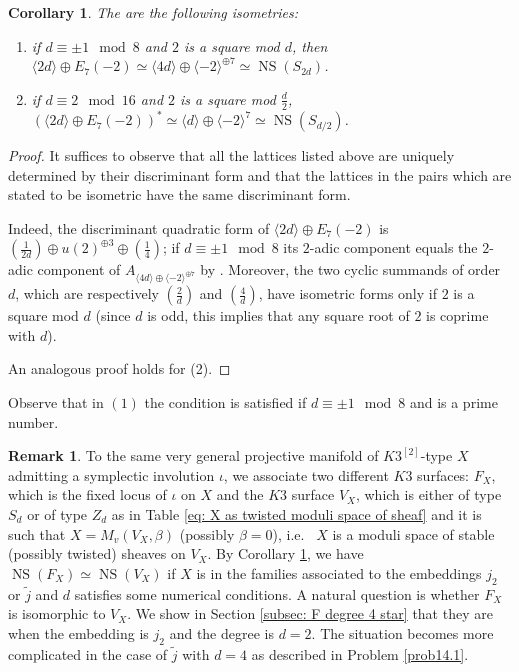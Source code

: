 \documentclass{amsart}
\newtheorem{cor}[thm]{Corollary}
\theoremstyle{definition}
\newtheorem{remark}[thm]{Remark}
\numberwithin{equation}{section}
\numberwithin{equation}{section} \theoremstyle{definition}
\DeclareMathOperator{\NS}{NS}
\begin{document}
\begin{cor}\label{cor: isom between NS(F) and NS(S),NS(Z)}  
The are the following isometries:
\begin{enumerate}
\item if $d\equiv \pm 1\mod 8$ and $2$ is a square mod $d$, then $\langle 2d\rangle\oplus E_7(-2)\simeq \langle 4d\rangle \oplus \langle -2\rangle^{\oplus 7}\simeq \NS(S_{2d})$.
\item if $d\equiv 2\mod 16$ and $2$ is a square mod $\frac{d}{2}$, $(\langle 2d\rangle\oplus E_7(-2))^*\simeq \langle d\rangle \oplus \langle -2\rangle^7\simeq \NS(S_{d/2})$.
\end{enumerate}\end{cor}
\begin{proof} It suffices to observe that all the lattices listed above are uniquely determined by their discriminant form and that the lattices in the pairs which are stated to be isometric have the same discriminant form.

Indeed, the discriminant quadratic form of $\langle 2d\rangle\oplus E_7(-2)$ is $\left(\frac{1}{2d}\right)\oplus u(2)^{\oplus 3}\oplus \left(\frac{1}{4}\right)$; if $d\equiv\pm 1\mod 8$ its $2$-adic component equals the $2$-adic component of $A_{\langle 4d\rangle \oplus \langle -2\rangle^{\oplus 7}}$ by \cite[Proposition 1.8.2 (g)]{N}. Moreover, the two cyclic summands of order $d$, which are respectively $\left(\frac{2}{d}\right)$ and $\left(\frac{4}{d}\right)$, have isometric forms only if  $2$ is a square mod $d$ (since $d$ is odd, this implies that any square root of $2$ is coprime with $d$).

An analogous proof holds for (2).\end{proof}
Observe that in $(1)$ the condition is satisfied if $d\equiv \pm1\mod 8$ and is a prime number. 

\begin{remark}{\rm To the same very general projective manifold of $K3^{[2]}$-type $X$ admitting a symplectic involution $\iota$, we associate two different $K3$ surfaces: $F_X$, which is the fixed locus of $\iota$ on $X$ and the $K3$ surface $V_X$, which is either of type $S_d$ or of type $Z_d$ as in Table \eqref{eq: X as twisted moduli space of sheaf} and it is such that $X=M_v(V_X,\beta)$ (possibly $\beta=0$), i.e.~ $X$ is a moduli space of stable (possibly twisted) sheaves on $V_X$. By Corollary \ref{cor: isom between NS(F) and NS(S),NS(Z)}, we have $\NS(F_X)\simeq \NS(V_X)$ if $X$ is in the families associated to the embeddings $j_2$ or $\tilde{j}$ and $d$ satisfies some numerical conditions.
A natural question is whether $F_X$ is isomorphic to $V_X$.  
We show in Section \ref{subsec: F degree 4 star} that they are when the embedding is $j_2$ and the degree is  $d=2$.
The situation becomes more complicated in the case of $\tilde{j}$ with $d=4$ as described in Problem \ref{prob14.1}. }\end{remark}
\end{document}

